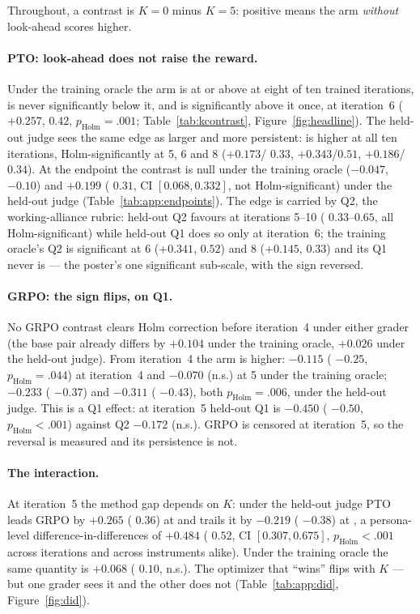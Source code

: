 Throughout, a contrast is $K{=}0$ minus $K{=}5$: positive means the arm \emph{without}
look-ahead scores higher.

\paragraph{PTO: look-ahead does not raise the reward.} Under the training oracle the \Kz{} arm
is at or above \Kf{} at eight of ten trained iterations, is never significantly below it, and is
significantly above it once, at iteration~6 ($+0.257$, \dz{} $0.42$, $p_{\text{Holm}}{=}.001$;
Table~\ref{tab:kcontrast}, Figure~\ref{fig:headline}). The held-out judge sees the same edge as larger and more persistent:
\Kz{} is higher at all ten iterations, Holm-significantly at 5, 6 and 8 ($+0.173$/\dz{} $0.33$, $+0.343$/$0.51$,
$+0.186$/$0.34$). At the endpoint the contrast is null under the training oracle ($-0.047$,
\dz{} $-0.10$) and $+0.199$ (\dz{} $0.31$, CI $[0.068, 0.332]$, not Holm-significant) under the
held-out judge (Table~\ref{tab:app:endpoints}). The edge is carried by Q2, the working-alliance rubric: held-out Q2 favours \Kz{}
at iterations 5--10 (\dz{} $0.33$--$0.65$, all Holm-significant) while held-out Q1 does so only
at iteration~6; the training oracle's Q2 is significant at 6 ($+0.341$, \dz{} $0.52$) and 8
($+0.145$, \dz{} $0.33$) and its Q1 never is --- the poster's one significant sub-scale, with the
sign reversed.

\paragraph{GRPO: the sign flips, on Q1.} No GRPO contrast clears Holm correction before
iteration~4 under either grader (the base pair already differs by $+0.104$ under the training
oracle, $+0.026$ under the held-out judge). From iteration~4
the \Kf{} arm is higher: $-0.115$ (\dz{} $-0.25$, $p_{\text{Holm}}{=}.044$) at
iteration~4 and $-0.070$ (n.s.) at 5 under the training oracle; $-0.233$ (\dz{} $-0.37$) and
$-0.311$ (\dz{} $-0.43$), both $p_{\text{Holm}}{=}.006$, under the held-out judge. This is a Q1
effect: at iteration~5 held-out Q1 is $-0.450$ (\dz{} $-0.50$, $p_{\text{Holm}}{<}.001$)
against Q2 $-0.172$ (n.s.). GRPO \Kf{} is censored at iteration~5, so the reversal is measured and its
persistence is not.

\paragraph{The interaction.} At iteration~5 the method gap depends on $K$: under the held-out judge PTO leads GRPO by $+0.265$ (\dz{} $0.36$) at \Kz{} and
trails it by $-0.219$ (\dz{} $-0.38$) at \Kf{}, a persona-level difference-in-differences of
$+0.484$ (\dz{} $0.52$, CI $[0.307, 0.675]$, $p_{\text{Holm}}{<}.001$ across iterations and
across instruments alike). Under the
training oracle the same quantity is $+0.068$ (\dz{} $0.10$, n.s.). The optimizer that ``wins''
flips with $K$ --- but one grader sees it and the other does not (Table~\ref{tab:app:did},
Figure~\ref{fig:did}).

